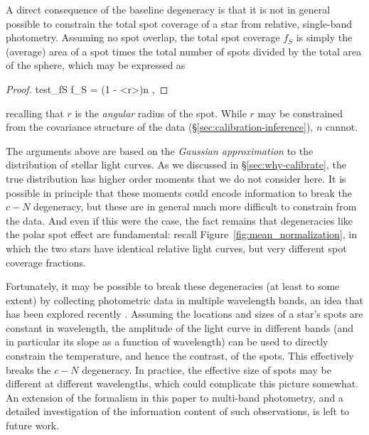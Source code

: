 \documentclass[modern]{aastex62}
\begin{document}
A direct consequence of the baseline degeneracy is that it is not in general
possible to constrain the total spot coverage of a star from relative,
single-band photometry. Assuming no spot overlap, the total spot coverage $f_S$ is simply the (average) area of a spot
times the total number of spots divided by the total area of the sphere, which
may be expressed as
%
\begin{proof}{test_fS}
    \label{eq:fS}
    f_S = \left(1 - \left<\cos r\right>\right)n
    \quad,
\end{proof}
%
recalling that $r$ is the \emph{angular} radius of the spot.
While $r$ may be constrained from the covariance structure of the data
(\S\ref{sec:calibration-inference}), $n$ cannot.

The arguments above are based on the \emph{Gaussian approximation} to the
distribution of stellar light curves. As we discussed in \S\ref{sec:why-calibrate},
the true distribution has higher order moments that we do not consider here.
It is possible in principle that these moments could encode information to
break the $c-N$ degeneracy, but these are in general much more difficult
to constrain from the data. And even if this were the case, the fact remains
that degeneracies like the polar spot effect are fundamental: recall
Figure~\ref{fig:mean_normalization}, in which the two stars
have identical relative light curves, but very different spot coverage
fractions.

Fortunately, it may be possible to break these degeneracies (at least to some extent)
by collecting photometric data in multiple wavelength bands, an idea that has
been explored recently \citep[e.g.,][]{Gully2017,Guo2018}. Assuming the
locations and sizes of a star's spots are constant in wavelength, the amplitude
of the light curve in different bands (and in particular its slope as a function
of wavelength) can be used to directly constrain the
temperature, and hence the contrast, of the spots. This effectively breaks the
$c-N$ degeneracy. In practice, the effective size of spots may be different
at different wavelengths, which could complicate this picture somewhat. An extension
of the formalism in this paper to multi-band photometry, and a detailed investigation
of the information content of such observations, is left to future work.


\end{document}
